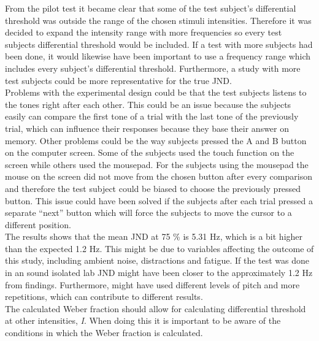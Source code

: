 From the pilot test it became clear that some of the test subject’s differential threshold was outside the range of the chosen stimuli intensities. Therefore it was decided to expand the intensity range with more frequencies so every test subjects differential threshold would be included. If a test with more subjects had been done, it would likewise have been important to use a frequency range which includes every subject’s differential threshold. Furthermore, a study with more test subjects could be more representative for the true JND.\\[5mm] 
%
Problems with the experimental design could be that the test subjects listens to the tones right after each other. This could be an issue because the subjects easily can compare the first tone of a trial with the last tone of the previously trial, which can influence their responses because they base their answer on memory. Other problems could be the way subjects pressed the A and B button on the computer screen. Some of the subjects used the touch function on the screen while others used the mousepad. For the subjects using the mousepad the mouse on the screen did not move from the chosen button after every comparison and therefore the test subject could be biased to choose the previously pressed button. This issue could have been solved if the subjects after each trial pressed a separate “next” button which will force the subjects to move the cursor to a different position.\\[5mm]
%  
The results shows that the mean JND at 75 \% is 5.31 Hz, which is a bit higher than the expected 1.2 Hz. This might be due to variables affecting the outcome of this study, including ambient noise, distractions and fatigue. If the test was done in an sound isolated lab JND might have been closer to the approximately 1.2 Hz from \citet{Wier1977} findings. Furthermore, \citet{Wier1977} might have used different levels of pitch and more repetitions, which can contribute to different results.\\[5mm] 
%
The calculated Weber fraction should allow for calculating differential threshold at other intensities, \textit{I}. When doing this it is important to be aware of the conditions in which the Weber fraction is calculated. 





 
